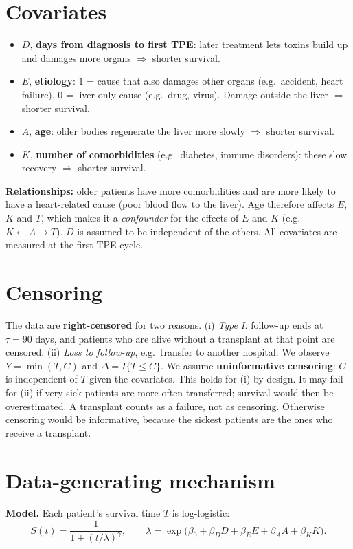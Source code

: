 \documentclass[10pt,a4paper]{article}
\begin{document}
\section{Covariates}
\begin{itemize}
\item $D$, \textbf{days from diagnosis to first TPE}: later treatment lets toxins build up and damages more organs $\Rightarrow$ shorter survival.
\item $E$, \textbf{etiology}: $1$ = cause that also damages other organs (e.g.\ accident, heart failure), $0$ = liver-only cause (e.g.\ drug, virus). Damage outside the liver $\Rightarrow$ shorter survival.
\item $A$, \textbf{age}: older bodies regenerate the liver more slowly $\Rightarrow$ shorter survival.
\item $K$, \textbf{number of comorbidities} (e.g.\ diabetes, immune disorders): these slow recovery $\Rightarrow$ shorter survival.
\end{itemize}
\textbf{Relationships:} older patients have more comorbidities and are more likely to have a heart-related cause (poor blood flow to the liver). Age therefore affects $E$, $K$ and $T$, which makes it a \emph{confounder} for the effects of $E$ and $K$ (e.g.\ $K\leftarrow A\rightarrow T$). $D$ is assumed to be independent of the others. All covariates are measured at the first TPE cycle.

\section{Censoring}
The data are \textbf{right-censored} for two reasons. (i) \emph{Type I:} follow-up ends at $\tau=90$ days, and patients who are alive without a transplant at that point are censored. (ii) \emph{Loss to follow-up}, e.g.\ transfer to another hospital. We observe $Y=\min(T,C)$ and $\Delta=I\{T\le C\}$.
We assume \textbf{uninformative censoring}: $C$ is independent of $T$ given the covariates. This holds for (i) by design. It may fail for (ii) if very sick patients are more often transferred; survival would then be overestimated. A transplant counts as a failure, not as censoring. Otherwise censoring would be informative, because the sickest patients are the ones who receive a transplant.

\section{Data-generating mechanism}
\label{sec:data_generating}
\textbf{Model.} Each patient's survival time $T$ is log-logistic:
\vspace{-4pt}
\[
S(t)=\frac{1}{1+(t/\lambda)^{\gamma}},\qquad \lambda=\exp\big(\beta_0+\beta_D D+\beta_E E+\beta_A A+\beta_K K\big).
\]
\vspace{-10pt}
\end{document}
